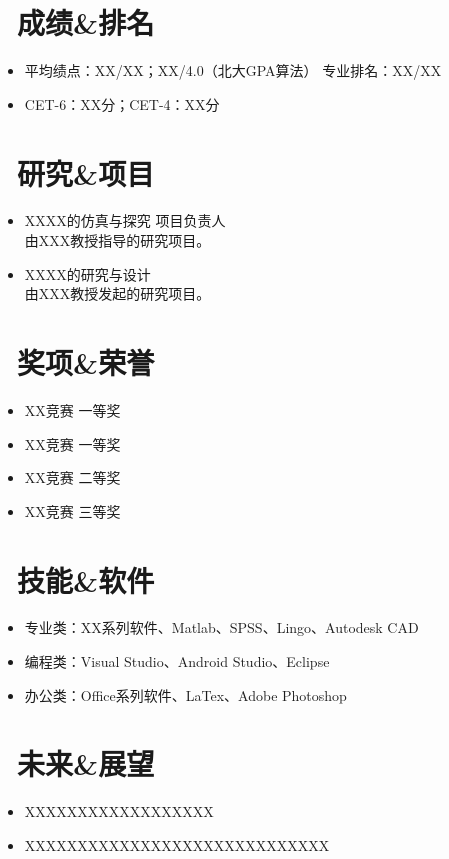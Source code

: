 \documentclass{resume}
\begin{document}
\normalsize{
\section{\faCheckCircle\ 成绩\&排名}
\begin{itemize}
\item 平均绩点：XX/XX；XX/4.0（北大GPA算法） \hfill 专业排名：XX/XX
\item CET-6：XX分；CET-4：XX分
\end{itemize}


\section{\faFlask\ 研究\&项目}
\begin{itemize}
\item XXXX的仿真与探究 \hfill 项目负责人 \\
由XXX教授指导的研究项目。 \\
\lipsum[1]

\item XXXX的研究与设计 \hfill \\
由XXX教授发起的研究项目。 \\
\lipsum[2]

\end{itemize}

\section{\faStar\ 奖项\&荣誉}
\begin{itemize}
\item XX竞赛 \hfill 一等奖
\item XX竞赛 \hfill 一等奖
\item XX竞赛 \hfill 二等奖
\item XX竞赛 \hfill 三等奖
\end{itemize}

\section{\faCogs\ 技能\&软件}
\begin{itemize}
\item 专业类：XX系列软件、Matlab、SPSS、Lingo、Autodesk CAD
\item 编程类：Visual Studio、Android Studio、Eclipse
\item 办公类：Office系列软件、LaTex、Adobe Photoshop
\end{itemize}

\section{\faMapSigns\ 未来\&展望}
\begin{itemize}
\item XXXXXXXXXXXXXXXXXX
\item XXXXXXXXXXXXXXXXXXXXXXXXXXXXX
\end{itemize}

}
\end{document}
